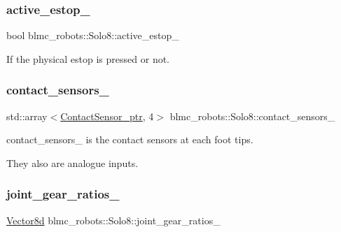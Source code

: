 \subsubsection{\texorpdfstring{active\+\_\+estop\+\_\+}{active\_estop\_}}
{\footnotesize\ttfamily bool blmc\+\_\+robots\+::\+Solo8\+::active\+\_\+estop\+\_\+\hspace{0.3cm}{\ttfamily [private]}}



If the physical estop is pressed or not. 

\mbox{\label{classblmc__robots_1_1Solo8_a67076041a87ea12b1a22d7f1759c759e}} 
\subsubsection{\texorpdfstring{contact\+\_\+sensors\+\_\+}{contact\_sensors\_}}
{\footnotesize\ttfamily std\+::array$<$\hyperlink{common__header_8hpp_ac78fe5c68e56a3b884117109959e4d58}{Contact\+Sensor\+\_\+ptr}, 4$>$ blmc\+\_\+robots\+::\+Solo8\+::contact\+\_\+sensors\+\_\+\hspace{0.3cm}{\ttfamily [private]}}



contact\+\_\+sensors\+\_\+ is the contact sensors at each foot tips. 

They also are analogue inputs. \mbox{\label{classblmc__robots_1_1Solo8_a09ab41c9822e1f1c853d0b9065205d2d}} 
\subsubsection{\texorpdfstring{joint\+\_\+gear\+\_\+ratios\+\_\+}{joint\_gear\_ratios\_}}
{\footnotesize\ttfamily \hyperlink{common__header_8hpp_a98975ffbe0bca1296078e0350dfedd60}{Vector8d} blmc\+\_\+robots\+::\+Solo8\+::joint\+\_\+gear\+\_\+ratios\+\_\+\hspace{0.3cm}{\ttfamily [private]}}



